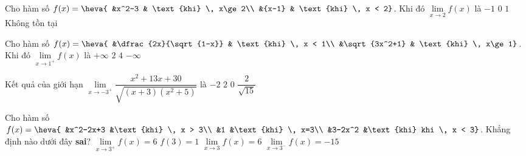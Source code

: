 \begin{ex}%
	Cho  hàm số $f(x)=\heva{
	&x^2-3 & \text{khi}  \, x\ge 2\\
	&{x-1} & \text{khi} \, x  < 2}$. Khi đó $\lim\limits_{x\to 2}f(x)$ là
	 \choice
		{$-1$} 
		 {$0$}
		{\True  $1$}
		{Không tồn  tại}
\end{ex}

\begin{ex}%
	Cho hàm số  $f(x)=\heva{
	&\dfrac{2x}{\sqrt{1-x}} & \text{khi} \, x < 1\\ 
	 &\sqrt{3x^2+1} & \text{khi} \, x\ge 1}$. Khi đó $\lim\limits_{x\to{1^+}}f(x)$ là
	\choice 
		{$+\infty$} 
		{\True  $2$}
		{$4$} 
		{$-\infty$} 
\end{ex}

\begin{ex}%
	Kết quả của giới hạn $\lim\limits_{x\to-3^+}\dfrac{x^2+13x+30}{\sqrt{(x+3)(x^2+5)}}$ là 
	\choice 
		 {$-2$}
		{$2$} 
		{\True $0$} 
		{$\dfrac{2}{\sqrt{15}}$} 
\end{ex}

\begin{ex}%
	 Cho hàm số $f(x)=\heva{
	&x^2-2x+3 &\text{khi} \,  x > 3\\
	&1  &\text{khi} \, x=3\\
	&3-2x^2 &\text{khi} khi  \, x < 3}$. Khẳng định nào dưới đây \textbf{sai}?
	 \choice
		 {$\lim\limits_{x\to{3^+}}f(x)=6$}
		{$f(3)=1$} 
		 {\True $\lim\limits_{x\to{3}}f(x)=6$}
		{$\lim\limits_{x\to{3^-}}f(x)=-15$} 
\end{ex}

